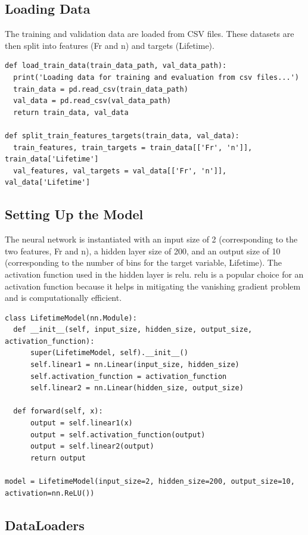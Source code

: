 \subsection*{Loading Data}

The training and validation data are loaded from CSV files. These datasets are then split into features (Fr and n) and targets (Lifetime).

\begin{verbatim}
def load_train_data(train_data_path, val_data_path):
  print('Loading data for training and evaluation from csv files...')
  train_data = pd.read_csv(train_data_path)
  val_data = pd.read_csv(val_data_path)
  return train_data, val_data

def split_train_features_targets(train_data, val_data):
  train_features, train_targets = train_data[['Fr', 'n']], train_data['Lifetime']
  val_features, val_targets = val_data[['Fr', 'n']], val_data['Lifetime']
\end{verbatim}

\subsection*{Setting Up the Model}

The neural network is instantiated with an input size of 2 (corresponding to the two features, Fr and n), a hidden layer size of 200, and an output size of 10 (corresponding to the number of bins for the target variable, Lifetime). The activation function used in the hidden layer is \ac{relu}. \ac{relu} is a popular choice for an activation function because it helps in mitigating the vanishing gradient problem and is computationally efficient.

\begin{verbatim}
class LifetimeModel(nn.Module):
  def __init__(self, input_size, hidden_size, output_size, activation_function):
      super(LifetimeModel, self).__init__()
      self.linear1 = nn.Linear(input_size, hidden_size)
      self.activation_function = activation_function
      self.linear2 = nn.Linear(hidden_size, output_size)

  def forward(self, x):
      output = self.linear1(x)
      output = self.activation_function(output)
      output = self.linear2(output)
      return output

model = LifetimeModel(input_size=2, hidden_size=200, output_size=10, activation=nn.ReLU())
\end{verbatim}

\subsection*{DataLoaders}

